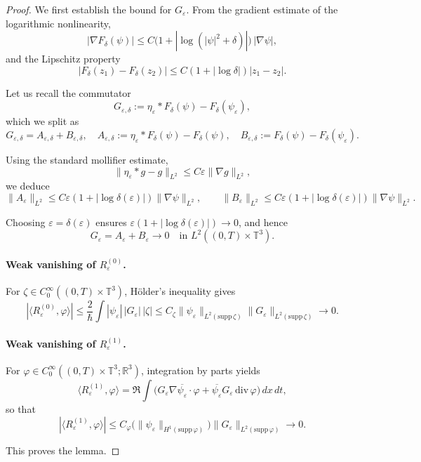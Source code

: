\documentclass[11pt]{article}
\begin{document}
\begin{proof}
We first establish the bound for $G_\varepsilon$.  
From the gradient estimate of the logarithmic nonlinearity,
\[
|\nabla F_\delta(\psi)| \le C \big(1 + |\log(|\psi|^2+\delta)|\big)\,|\nabla\psi|,
\]
and the Lipschitz property
\[
|F_\delta(z_1) - F_\delta(z_2)| \le C(1 + |\log \delta|) |z_1 - z_2|.
\]


Let us recall
 the commutator
\[
G_{\varepsilon,\delta} := \eta_\varepsilon * F_\delta(\psi) - F_\delta(\psi_\varepsilon),
\]
which we split as
\begin{equation}\label{eq:G-split-log}
G_{\varepsilon,\delta} = A_{\varepsilon,\delta} + B_{\varepsilon,\delta}, \quad
A_{\varepsilon,\delta} := \eta_\varepsilon * F_\delta(\psi) - F_\delta(\psi),\quad
B_{\varepsilon,\delta} := F_\delta(\psi) - F_\delta(\psi_\varepsilon).
\end{equation}

Using the standard mollifier estimate,
\[
\|\eta_\varepsilon * g - g\|_{L^2} \le C \varepsilon \|\nabla g\|_{L^2},
\]
we deduce
\[
\|A_\varepsilon\|_{L^2} \le C \varepsilon (1 + |\log \delta(\varepsilon)|)\|\nabla \psi\|_{L^2},\qquad
\|B_\varepsilon\|_{L^2} \le C \varepsilon (1 + |\log \delta(\varepsilon)|)\|\nabla \psi\|_{L^2}.
\]

Choosing $\varepsilon=\delta(\varepsilon) $ ensures $\varepsilon(1 + |\log \delta(\varepsilon)|) \to 0$, and hence
\[
G_\varepsilon = A_\varepsilon + B_\varepsilon \to 0 \quad \text{in } L^2((0,T)\times \mathbb{T}^3).
\]




\paragraph{Weak vanishing of $R^{(0)}_\varepsilon$.}  
For $\zeta \in C_0^\infty((0,T)\times\mathbb{T}^3)$, Hölder's inequality gives
\[
|\langle R^{(0)}_\varepsilon, \varphi \rangle|
\le \frac{2}{\hbar} \int |\psi_\varepsilon|\,|G_\varepsilon|\,|\zeta|
\le C_\zeta \|\psi_\varepsilon\|_{L^2(\mathrm{supp}\,\zeta)} \|G_\varepsilon\|_{L^2(\mathrm{supp}\,\zeta)} \to 0.
\]

\paragraph{Weak vanishing of $R^{(1)}_\varepsilon$.}  
For $\varphi \in C_0^\infty((0,T)\times\mathbb{T}^3;\mathbb{R}^3)$, integration by parts yields
\[
\langle R^{(1)}_\varepsilon, \varphi \rangle = \Re \int \big( G_\varepsilon \nabla \overline{\psi_\varepsilon} \cdot \varphi + \overline{\psi_\varepsilon} G_\varepsilon\, \mathrm{div}\,\varphi \big)\,dx\,dt,
\]
so that
\[
|\langle R^{(1)}_\varepsilon, \varphi \rangle| \le C_\varphi \big( \|\psi_\varepsilon\|_{H^1(\mathrm{supp}\,\varphi)} \big) \|G_\varepsilon\|_{L^2(\mathrm{supp}\,\varphi)} \to 0.
\]

This proves the lemma.
\end{proof}
\end{document}
